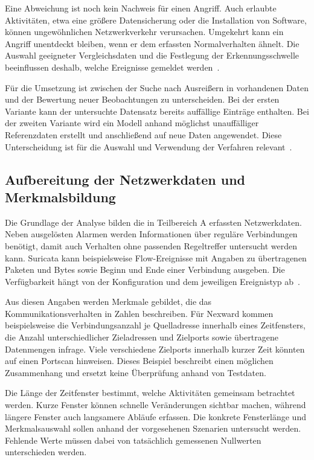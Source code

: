 Eine Abweichung ist noch kein Nachweis für einen Angriff. Auch erlaubte Aktivitäten, etwa eine größere Datensicherung oder die Installation von Software, können ungewöhnlichen Netzwerkverkehr verursachen. Umgekehrt kann ein Angriff unentdeckt bleiben, wenn er dem erfassten Normalverhalten ähnelt. Die Auswahl geeigneter Vergleichsdaten und die Festlegung der Erkennungsschwelle beeinflussen deshalb, welche Ereignisse gemeldet werden~\cite[Abschnitt~2.2.2]{raichle-nist-idps}.

Für die Umsetzung ist zwischen der Suche nach Ausreißern in vorhandenen Daten und der Bewertung neuer Beobachtungen zu unterscheiden. Bei der ersten Variante kann der untersuchte Datensatz bereits auffällige Einträge enthalten. Bei der zweiten Variante wird ein Modell anhand möglichst unauffälliger Referenzdaten erstellt und anschließend auf neue Daten angewendet. Diese Unterscheidung ist für die Auswahl und Verwendung der Verfahren relevant~\cite{raichle-sklearn-outliers}.

\subsection{Aufbereitung der Netzwerkdaten und Merkmalsbildung}

Die Grundlage der Analyse bilden die in Teilbereich A erfassten Netzwerkdaten. Neben ausgelösten Alarmen werden Informationen über reguläre Verbindungen benötigt, damit auch Verhalten ohne passenden Regeltreffer untersucht werden kann. Suricata kann beispielsweise Flow-Ereignisse mit Angaben zu übertragenen Paketen und Bytes sowie Beginn und Ende einer Verbindung ausgeben. Die Verfügbarkeit hängt von der Konfiguration und dem jeweiligen Ereignistyp ab~\cite{raichle-suricata-eve}.

Aus diesen Angaben werden Merkmale gebildet, die das Kommunikationsverhalten in Zahlen beschreiben. Für Nexward kommen beispielsweise die Verbindungsanzahl je Quelladresse innerhalb eines Zeitfensters, die Anzahl unterschiedlicher Zieladressen und Zielports sowie übertragene Datenmengen infrage. Viele verschiedene Zielports innerhalb kurzer Zeit könnten auf einen Portscan hinweisen. Dieses Beispiel beschreibt einen möglichen Zusammenhang und ersetzt keine Überprüfung anhand von Testdaten.

Die Länge der Zeitfenster bestimmt, welche Aktivitäten gemeinsam betrachtet werden. Kurze Fenster können schnelle Veränderungen sichtbar machen, während längere Fenster auch langsamere Abläufe erfassen. Die konkrete Fensterlänge und Merkmalsauswahl sollen anhand der vorgesehenen Szenarien untersucht werden. Fehlende Werte müssen dabei von tatsächlich gemessenen Nullwerten unterschieden werden.

